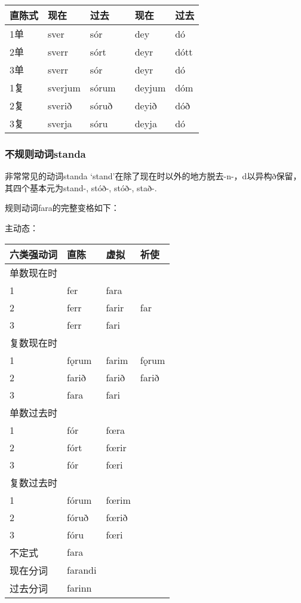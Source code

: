 \begin{longtable}{llllll}
    \toprule
    直陈式 & 现在    & 过去  &  & 现在   & 过去 \\
    \midrule
    \endhead
    \bottomrule
    \endfoot
    1单    & sver    & sór   &  & dey    & dó   \\
    2单    & sverr   & sórt  &  & deyr   & dótt \\
    3单    & sverr   & sór   &  & deyr   & dó   \\
    1复    & sverjum & sórum &  & deyjum & dóm  \\
    2复    & sverið  & sóruð &  & deyið  & dóð  \\
    3复    & sverja  & sóru  &  & deyja  & dó   \\
\end{longtable}

\subsubsection{不规则动词standa}

非常常见的动词standa `stand‌'在除了现在时以外的地方脱去-n-，d以异构ð保留，其四个基本元为stand-, stóð-, stóð-, stað-.


规则动词fara的完整变格如下：

主动态：


\begin{longtable}{llll}
    \toprule
    六类强动词 & 直陈    & 虚拟  & 祈使  \\
    \midrule
    \endhead
    \bottomrule
    \endfoot
    单数现在时 &         &       &       \\
    1          & fer     & fara  &       \\
    2          & ferr    & farir & far   \\
    3          & ferr    & fari  &       \\
    复数现在时 &         &       &       \\
    1          & fǫrum   & farim & fǫrum \\
    2          & farið   & farið & farið \\
    3          & fara    & fari  &       \\
    单数过去时 &         &       &       \\
    1          & fór     & fœra  &       \\
    2          & fórt    & fœrir &       \\
    3          & fór     & fœri  &       \\
    复数过去时 &         &       &       \\
    1          & fórum   & fœrim &       \\
    2          & fóruð   & fœrið &       \\
    3          & fóru    & fœri  &       \\
    不定式     & fara    &       &       \\
    现在分词   & farandi &       &       \\
    过去分词   & farinn  &       &       \\
\end{longtable}

